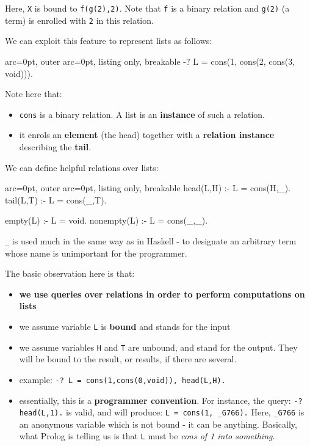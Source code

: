 Here, \texttt{X} is bound to \texttt{f(g(2),2)}. Note that \texttt{f} is a binary relation and \texttt{g(2)} (a term) is enrolled with \texttt{2} in this relation.

We can exploit this feature to represent lists as follows:

\begin{tcblisting}{ arc=0pt, outer arc=0pt, listing only, breakable}
-? L = cons(1, cons(2, cons(3, void))).

\end{tcblisting}

Note here that:
\begin{itemize}
	\item  \texttt{cons} is a binary relation. A list is an \textbf{instance} of such a relation.
	\item  it enrols an \textbf{element} (the head) together with a \textbf{relation instance} describing the \textbf{tail}.
\end{itemize}

We can define helpful relations over lists:

\begin{tcblisting}{ arc=0pt, outer arc=0pt, listing only, breakable}
head(L,H) :- L = cons(H,_).
tail(L,T) :- L = cons(_,T).

empty(L) :- L = void.
nonempty(L) :- L = cons(_,_).

\end{tcblisting}


\texttt{\_} is used much in the same way as in Haskell - to designate an arbitrary term whose name is unimportant for the programmer.

The basic observation here is that:
\begin{itemize}
	\item  \textbf{we use queries over relations in order to perform computations on lists}
	\item  we assume variable \texttt{L} is \textbf{bound} and stands for the input
	\item  we assume variables \texttt{H} and \texttt{T} are unbound, and stand for the output. They will be bound to the result, or results, if there are several.
	\item  example: \texttt{-? L = cons(1,cons(0,void)), head(L,H).}
	\item  essentially, this is a \textbf{programmer convention}. For instance, the query: \texttt{-? head(L,1).} is valid, and will produce: \texttt{L = cons(1, \_G766).} Here, \texttt{\_G766} is an anonymous variable which is not bound - it can be anything. Basically, what Prolog is telling us is that \texttt{L} must be \textit{cons of 1 into something}.
\end{itemize}

